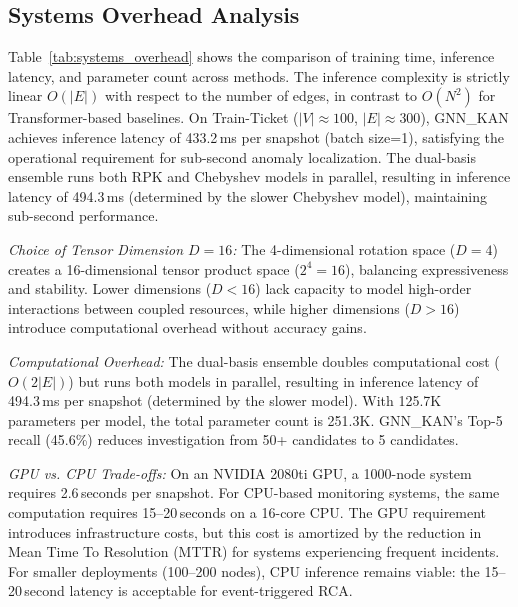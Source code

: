 \documentclass[conference]{IEEEtran}
\begin{document}
\subsection{Systems Overhead Analysis}

Table~\ref{tab:systems_overhead} shows the comparison of training time, inference latency, and parameter count across methods. The inference complexity is strictly linear $O(|E|)$ with respect to the number of edges, in contrast to $O(N^2)$ for Transformer-based baselines. On Train-Ticket ($|V| \approx 100$, $|E| \approx 300$), GNN\_KAN achieves inference latency of 433.2\,ms per snapshot (batch size=1), satisfying the operational requirement for sub-second anomaly localization. The dual-basis ensemble runs both RPK and Chebyshev models in parallel, resulting in inference latency of 494.3\,ms (determined by the slower Chebyshev model), maintaining sub-second performance.

\textit{Choice of Tensor Dimension $D=16$:} The 4-dimensional rotation space ($D=4$) creates a 16-dimensional tensor product space ($2^4=16$), balancing expressiveness and stability. Lower dimensions ($D<16$) lack capacity to model high-order interactions between coupled resources, while higher dimensions ($D>16$) introduce computational overhead without accuracy gains. 

\textit{Computational Overhead:} The dual-basis ensemble doubles computational cost ($O(2|E|)$) but runs both models in parallel, resulting in inference latency of 494.3\,ms per snapshot (determined by the slower model). With 125.7K parameters per model, the total parameter count is 251.3K. GNN\_KAN's Top-5 recall (45.6\%) reduces investigation from 50+ candidates to 5 candidates.

\textit{GPU vs. CPU Trade-offs:} On an NVIDIA 2080ti GPU, a 1000-node system requires 2.6\,seconds per snapshot. For CPU-based monitoring systems, the same computation requires 15--20\,seconds on a 16-core CPU. The GPU requirement introduces infrastructure costs, but this cost is amortized by the reduction in Mean Time To Resolution (MTTR) for systems experiencing frequent incidents. For smaller deployments (100--200 nodes), CPU inference remains viable: the 15--20\,second latency is acceptable for event-triggered RCA.
\end{document}

